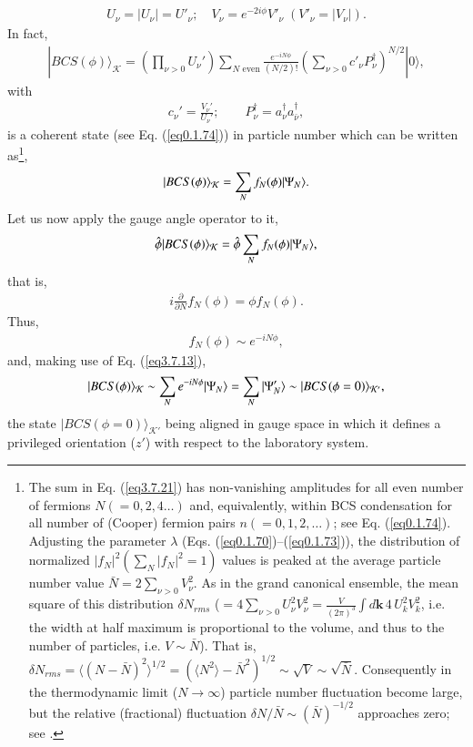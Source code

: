 \begin{align}
U_\nu=|U_\nu|=U'_\nu;\quad V_\nu=e^{-2i\phi}V'_\nu \;(V'_\nu=|V_\nu|).
\end{align}
In fact, 
\begin{align}\label{eq3.7.19}
|BCS(\phi)\rangle_{\mathcal{K}}=\left(\prod_{\nu>0}U_\nu'\right)\sum_{N\text{ even}}\frac{e^{-iN\phi}}{(N/2)!}\left(\sum_{\nu>0}c'_\nu P^\dagger_\nu\right)^{N/2}|0\rangle,
\end{align}
with
\begin{align}
c_\nu'=\frac{V_\nu'}{U_\nu'};\quad \quad P^\dagger_\nu=a^\dagger_\nu a^\dagger_{\bar\nu},
\end{align}
is a coherent state (see Eq. (\ref{eq0.1.74})) in particle number which can be written as\footnote{The sum in Eq. (\ref{eq3.7.21}) has non-vanishing amplitudes for all even number of fermions $N(=0,2,4\dots)$ and, equivalently, within BCS condensation for all number of (Cooper) fermion pairs $n(=0,1,2,\dots)$; see Eq. (\ref{eq0.1.74}). Adjusting the parameter $\lambda$ (Eqs. (\ref{eq0.1.70})--(\ref{eq0.1.73})), the distribution of normalized $|f_N|^2(\sum_N |f_N|^2=1)$ values is peaked at the average particle number value $\bar N=2\sum_{\nu>0}V_\nu^2$. As in the grand canonical ensemble, the mean square of this distribution $\delta N_{rms}$ ($=4\sum_{\nu>0}U_\nu^2V_\nu^2=\tfrac{V}{(2\pi)^3}\int d\mathbf k\,4\,U^2_kV^2_k$, i.e. the width at half maximum is proportional to the volume, and thus to the number of particles, i.e. $V\sim \bar N$). That is, $\delta N_{rms}=\langle(N-\bar N)^2\rangle^{1/2}=(\langle N^2\rangle-\bar N^2)^{1/2}\sim\sqrt{V}\sim\sqrt{\bar N}$. Consequently in the thermodynamic limit ($N\to\infty$) particle number fluctuation become large, but the relative (fractional) fluctuation $\delta N/\bar N\sim(\bar N)^{-1/2}$ approaches zero; see \cite{Schrieffer:64,Tinkham:96,DeGennes:66}.},
\begin{align}\label{eq3.7.21}
|{BCS(\phi)} \rangle_{\mathcal K}=\sum_N f_N(\phi)|{\Psi_N} \rangle.
\end{align}
Let us now apply the gauge angle operator to it,
\begin{align}
\hat{\phi}|{BCS(\phi)} \rangle_{\mathcal K}=\hat{\phi}\sum_{N}f_N(\phi)|{\Psi_N} \rangle,
\end{align}
that is,
\begin{align}
i\frac{\partial}{\partial N}f_N(\phi)=\phi f_N(\phi).
\end{align}
Thus,
\begin{align}
f_N(\phi)\sim e^{-iN\phi},
\end{align}
and, making use of Eq. (\ref{eq3.7.13}),
\begin{align}\label{eq4.7.25}
|{BCS(\phi)} \rangle_{\mathcal K}\sim \sum_{N} e^{-iN\phi}|{\Psi_N} \rangle=\sum_N |{\Psi'_{N}} \rangle\sim|{BCS(\phi=0)} \rangle_{\mathcal K'},
\end{align}
 the state $|BCS(\phi=0)\rangle_{\mathcal{K}'}$ being aligned in gauge space in which it defines a privileged orientation ($z'$) with respect to the laboratory system.


